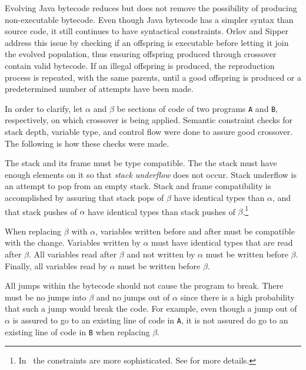 \documentclass{sig-alternate}
\begin{document}
Evolving Java bytecode reduces but does not remove the possibility of producing non-executable bytecode. Even though Java bytecode has a simpler syntax than source code, it still continues to have syntactical constraints. Orlov and Sipper~\cite{FINCH2:2009} address this issue by checking if an offspring is executable before letting it join the evolved population, thus ensuring offspring produced through crossover contain valid bytecode. If an illegal offspring is produced, the reproduction process is repeated, with the same parents, until a good offspring is produced or a predetermined number of attempts have been made.\par

In order to clarify, let $\alpha$ and $\beta$ be sections of code of two programs \texttt{A} and \texttt{B}, respectively, on which crossover is being applied. Semantic constraint checks for stack depth, variable type, and control flow were done to assure good crossover. The following is how these checks were made.\par

The stack and its frame must be type compatible. The the stack must have enough elements on it so that \textit{stack underflow} does not occur. Stack underflow is an attempt to pop from an empty stack. Stack and frame compatibility is accomplished by assuring that stack pops of $\beta$ have identical types than $\alpha$, and that stack pushes of $\alpha$ have identical types than stack pushes of $\beta$.\footnote{In~\cite{FINCH2:2009} the constraints are more sophisticated. See \cite{FINCH2:2009} for more details.} \par

When replacing $\beta$ with $\alpha$, variables written before and after must be compatible with the change. Variables written by $\alpha$ must have identical types that are read after $\beta$. All variables read after $\beta$ and not written by $\alpha$ must be written before $\beta$. Finally, all variables read by $\alpha$ must be written before $\beta$.\par

All jumps within the bytecode should not cause the program to break. There must be no jumps into $\beta$ and no jumps out of $\alpha$ since there is a high probability that such a jump would break the code. For example, even though a jump out of $\alpha$ is assured to go to an existing line of code in \texttt{A}, it is not assured do go to an existing line of code in \texttt{B} when replacing $\beta$.
\end{document}
